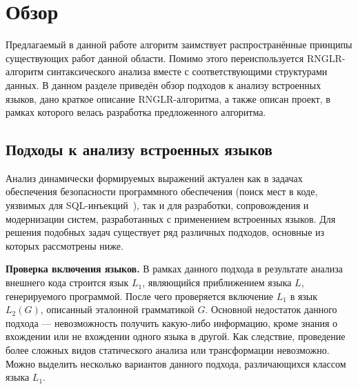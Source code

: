 \section{Обзор}
Предлагаемый в данной работе алгоритм заимствует распространённые принципы существующих работ данной области. Помимо этого переиспользуется RNGLR-алгоритм синтаксического анализа вместе с соответствующими структурами данных. В данном разделе приведён обзор подходов к анализу встроенных языков, дано краткое описание RNGLR-алгоритма, а также описан проект, в рамках которого велась разработка предложенного алгоритма.

\subsection{Подходы к анализу встроенных языков}\label{SELAnalysisDescr}

Анализ динамически формируемых выражений актуален как в задачах обеспечения безопасности программного обеспечения (поиск мест в коде, уязвимых для SQL-инъекций~\cite{SQLInjection}), так и для разработки, сопровождения и модернизации систем, разработанных с применением встроенных языков. Для решения подобных задач существует ряд различных подходов, основные из которых рассмотрены ниже.

\textbf{Проверка включения языков.} В рамках данного подхода в результате анализа внешнего кода строится язык $L_1$, являющийся приближением языка $L$, генерируемого программой. После чего проверяется включение $L_1$ в язык $L_2(G)$, описанный эталонной грамматикой $G$. Основной недостаток данного подхода --- невозможность получить какую-либо информацию, кроме знания о вхождении или не вхождении одного языка в другой. Как следствие, проведение более сложных видов статического анализа или трансформации невозможно. Можно выделить несколько вариантов данного подхода, различающихся классом языка $L_1$.

